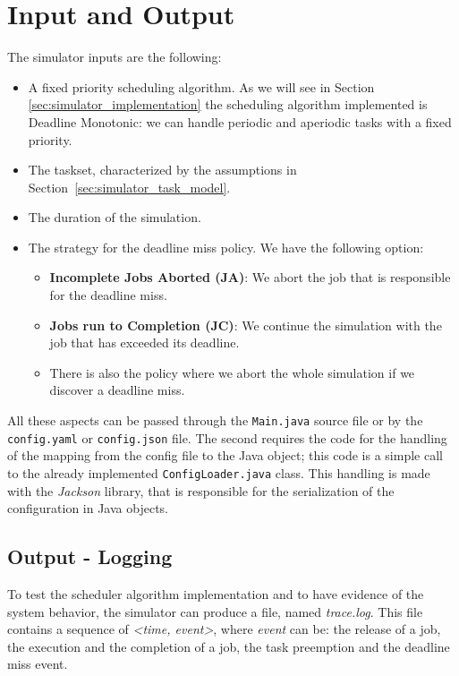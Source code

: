 \section{Input and Output}
The simulator inputs are the following:
\begin{itemize}
    \item A fixed priority scheduling algorithm. As we will see in Section \ref{sec:simulator_implementation} the scheduling algorithm implemented is Deadline Monotonic: we can handle periodic and aperiodic tasks with a fixed priority.
    \item The taskset, characterized by the assumptions in Section~\ref{sec:simulator_task_model}.
    \item The duration of the simulation.
    \item The strategy for the deadline miss policy. We have the following option: 
    \begin{itemize}
        \item \textbf{Incomplete Jobs Aborted (JA)}: We abort the job that is responsible for the deadline miss.
        \item \textbf{Jobs run to Completion (JC)}: We continue the simulation with the job that has exceeded its deadline.
        \item There is also the policy where we abort the whole simulation if we discover a deadline miss.
    \end{itemize}
\end{itemize}

All these aspects can be passed through the \texttt{Main.java} source file or by the \texttt{config.yaml} or \texttt{config.json} file. The second requires the code for the handling of the mapping from the config file to the Java object; this code is a simple call to the already implemented \texttt{ConfigLoader.java} class. This handling is made with the \textit{Jackson} library, that is responsible for the serialization of the configuration in Java objects.

\subsection{Output - Logging}
To test the scheduler algorithm implementation and to have evidence of the system behavior, the simulator can produce a file, named \textit{trace.log}. This file contains a sequence of \textit{<time, event>}, where \textit{event} can be: the release of a job, the execution and the completion of a job, the task preemption and the deadline miss event.

